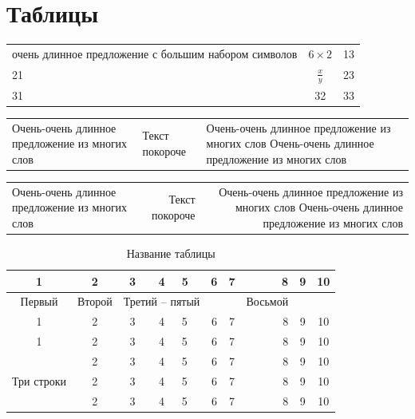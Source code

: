 \documentclass[russian]{beamer}
\begin{document}
\section{Таблицы}

\setlength{\extrarowheight}{6mm}

\begin{frame}
\begin{tabular}{|p{4cm}cr|}
	\hline
	 очень длинное предложение с большим набором символов & $6\times2$ & 13 \\
	 21 &  $\displaystyle\frac{x}{y}$ & 23 \\[6mm]
	\hline
	 31 & 32 & 33 \\
	\hline
\end{tabular}
\setlength{\extrarowheight}{0mm}
\end{frame}

\begin{frame}
	\begin{tabularx}{\textwidth}{X|X|X}
		\hline 
		Очень-очень длинное предложение из многих слов & Текст покороче & 
		Очень-очень длинное предложение из многих слов Очень-очень длинное предложение из многих слов
	\end{tabularx}
\end{frame}

\begin{frame}
	\begin{tabulary}{\textwidth}{L|R|R}
		\hline 
		Очень-очень длинное предложение из многих слов 
		& Текст покороче & 
		Очень-очень длинное предложение из многих слов Очень-очень длинное предложение из многих слов
	\end{tabulary}
\end{frame}

\begin{frame}
	\begin{table}[h]
		\begin{center}
			\caption{Название таблицы}
			\begin{tabular}{|c|c|c|c||l|c|c|r|c|c|}
				\hline
				1 & 2 & 3 & 4 & 5 & 6 & 7 & 8 & 9 & 10 \\ \hline
				Первый & Второй & \multicolumn{3}{|c|}{Третий -- пятый}
				& & & Восьмой & & \\
				\cline{1-7} \cline{9-10}
				1 & 2 & 3 & 4 & 5 & 6 & 7 & 8 & 9 & 10 \\ \hline \hline
				1 & 2 & 3 & 4 & 5 & 6 & 7 & 8 & 9 & 10 \\ \hline
				\multirow{3}{*}{Три строки} & 2 & 3 & 4 & 5 & 6 & 7 & 8 & 9 & 10 \\ \cline{2-10}
				& 2 & 3 & 4 & 5 & 6 & 7 & 8 & 9 & 10 \\ \cline{2-10}
				& 2 & 3 & 4 & 5 & 6 & 7 & 8 & 9 & 10 \\ \hline
			\end{tabular}
		\end{center}
	\end{table}
\end{frame}
\end{document}
